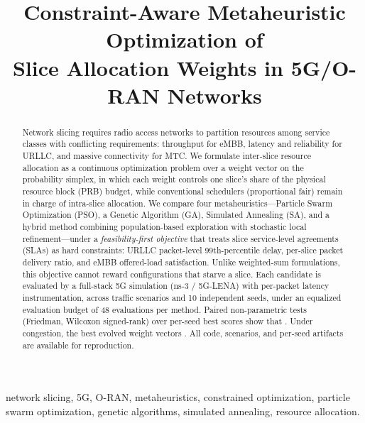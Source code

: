 \documentclass[conference]{IEEEtran}
\newif\ifdraftpending
\newcommand{\pending}[1]{%
  \ifdraftpending{\color{red}\textbf{[PENDING-v2: #1]}}\else{}\fi}
\begin{document}
\title{Constraint-Aware Metaheuristic Optimization of\\
Slice Allocation Weights in 5G/O-RAN Networks}

\author{\IEEEauthorblockN{\pending{author names}}
\IEEEauthorblockA{\pending{affiliation, city, country}\\
\pending{emails}}}

\maketitle

\begin{abstract}
Network slicing requires radio access networks to partition resources among
service classes with conflicting requirements: throughput for eMBB, latency
and reliability for URLLC, and massive connectivity for MTC. We formulate
inter-slice resource allocation as a continuous optimization problem over a
weight vector on the probability simplex, in which each weight controls one
slice's share of the physical resource block (PRB) budget, while conventional
schedulers (proportional fair) remain in charge of intra-slice allocation. We
compare four metaheuristics---Particle Swarm Optimization (PSO), a Genetic
Algorithm (GA), Simulated Annealing (SA), and a hybrid method combining
population-based exploration with stochastic local refinement---under a
\emph{feasibility-first objective} that treats slice service-level agreements
(SLAs) as hard constraints: URLLC packet-level 99th-percentile delay,
per-slice packet delivery ratio, and eMBB offered-load satisfaction. Unlike
weighted-sum formulations, this objective cannot reward configurations that
starve a slice. Each candidate is evaluated by a full-stack 5G simulation
(ns-3 / 5G-LENA) with per-packet latency instrumentation, across
\pending{4} traffic scenarios and 10 independent seeds, under an equalized
evaluation budget of 48 evaluations per method. Paired non-parametric tests
(Friedman, Wilcoxon signed-rank) over per-seed best scores show that
\pending{main statistical finding}. Under congestion, the best evolved weight
vectors \pending{headline physical result: deadline-violation rate / worst-slice
SLA vs.\ baselines}. All code, scenarios, and per-seed artifacts are available
for reproduction.
\end{abstract}

\begin{IEEEkeywords}
network slicing, 5G, O-RAN, metaheuristics, constrained optimization, particle
swarm optimization, genetic algorithms, simulated annealing, resource
allocation.
\end{IEEEkeywords}
\end{document}

